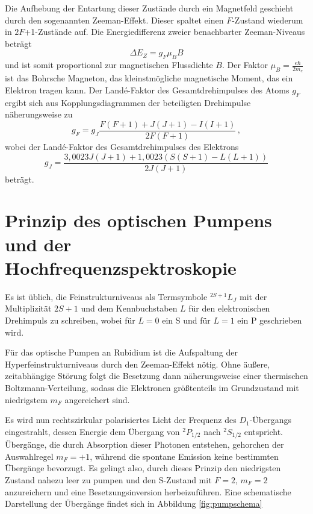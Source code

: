   Die Aufhebung der Entartung dieser Zustände durch ein Magnetfeld geschieht durch den sogenannten Zeeman-Effekt. Dieser spaltet einen $F$-Zustand wiederum in $2F$+1-Zustände auf. Die Energiedifferenz zweier benachbarter Zeeman-Niveaus beträgt
  \begin{equation}
    \Delta E_Z = g_F \mu_B B
    \label{eqn:zeemanDifferenz}
  \end{equation}
  und ist somit proportional zur magnetischen Flussdichte $B$. Der Faktor $\mu_B = \frac{e \hbar}{2m_e}$ ist das Bohrsche Magneton, das kleinstmögliche magnetische Moment, das ein Elektron tragen kann. Der Landé-Faktor des Gesamtdrehimpulses des Atoms $g_F$ ergibt sich aus Kopplungsdiagrammen der beteiligten Drehimpulse näherungsweise zu
  \begin{equation}
    g_F = g_J \frac{F(F+1)+J(J+1)-I(I+1)}{2F(F+1)}\,,
    \label{eqn:g_F_Theorie}
  \end{equation}
  wobei der Landé-Faktor des Gesamtdrehimpulses des Elektrons
  \begin{equation}
    g_J = \frac{3,0023J(J+1)+1,0023(S(S+1)-L(L+1))}{2J(J+1)}
    \label{eqn:g_J_Theorie}
  \end{equation}
  beträgt.

  \section{Prinzip des optischen Pumpens und der Hochfrequenzspektroskopie}
  \label{subsec:prinzipOptischesPumpen}

  Es ist üblich, die Feinstrukturniveaus als Termsymbole ${}^{2S+1}L_J$ mit der Multiplizität $2S+1$ und dem Kennbuchstaben $L$ für den elektronischen Drehimpuls zu schreiben, wobei für $L=0$ ein S und für $L=1$ ein P geschrieben wird.

  Für das optische Pumpen an Rubidium ist die Aufspaltung der Hyperfeinstrukturniveaus durch den Zeeman-Effekt nötig. Ohne äußere, zeitabhängige Störung folgt die Besetzung dann näherungsweise einer thermischen Boltzmann-Verteilung, sodass die Elektronen größtenteils im Grundzustand mit niedrigstem $m_F$ angereichert sind.

  Es wird nun rechtszirkular polarisiertes Licht der Frequenz des $D_1$-Übergangs eingestrahlt, dessen Energie dem Übergang von ${}^{2}P_{1/2}$ nach ${}^{2}S_{1/2}$ entspricht. Übergänge, die durch Absorption dieser Photonen entstehen, gehorchen der Auswahlregel $m_F=+1$, während die spontane Emission keine bestimmten Übergänge bevorzugt. Es gelingt also, durch dieses Prinzip den niedrigsten Zustand nahezu leer zu pumpen und den S-Zustand mit $F=2$, $m_F=2$ anzureichern und eine Besetzungsinversion herbeizuführen. Eine schematische Darstellung der Übergänge findet sich in Abbildung \ref{fig:pumpschema}


